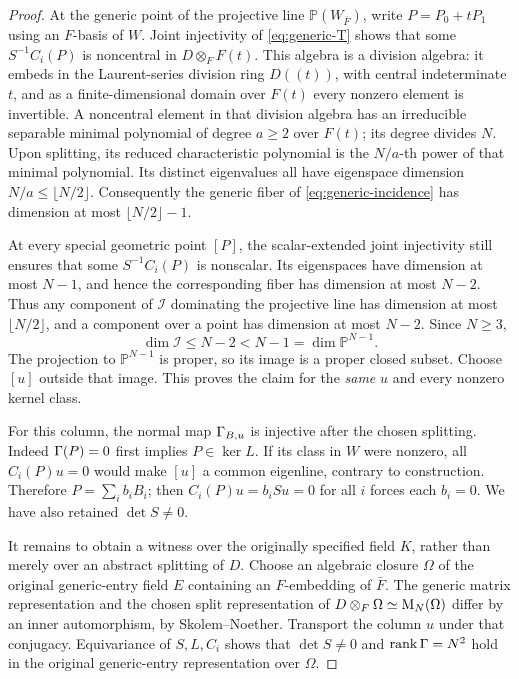 \begin{proof}
At the generic point of the projective line
$\mathbb P(W_{\bar F})$, write $P=P_0+tP_1$ using an
$F$-basis of $W$. Joint injectivity of \eqref{eq:generic-T}
shows that some $S^{-1}C_i(P)$ is noncentral in
$D\otimes_FF(t)$. This algebra is a division algebra:
it embeds in the Laurent-series division ring $D((t))$,
with central indeterminate $t$, and as a finite-dimensional
domain over $F(t)$ every nonzero element is invertible.
A noncentral element in that division algebra has an
irreducible separable minimal polynomial of degree $a\ge2$
over $F(t)$; its degree divides $N$. Upon splitting, its
reduced characteristic polynomial is the $N/a$-th power of
that minimal polynomial. Its distinct eigenvalues all have
eigenspace dimension $N/a\le\lfloor N/2\rfloor$.
Consequently the generic fiber of \eqref{eq:generic-incidence}
has dimension at most $\lfloor N/2\rfloor-1$.

At every special geometric point $[P]$, the scalar-extended
joint injectivity still ensures that some
$S^{-1}C_i(P)$ is nonscalar. Its eigenspaces have dimension
at most $N-1$, and hence the corresponding fiber has
dimension at most $N-2$. Thus any component of
$\mathcal I$ dominating the projective line has dimension
at most $\lfloor N/2\rfloor$, and a component over a
point has dimension at most $N-2$. Since $N\ge3$,
\begin{equation}\label{eq:incidence-bound}
 \dim\mathcal I\le N-2<N-1=\dim\mathbb P^{N-1}.
\end{equation}
The projection to $\mathbb P^{N-1}$ is proper, so its image
is a proper closed subset. Choose $[u]$ outside that image.
This proves the claim for the \emph{same} $u$ and every
nonzero kernel class.

For this column, the normal map $\Gamma_{B,u}$ is injective
after the chosen splitting. Indeed $\Gamma(P)=0$ first implies
$P\in\ker L$. If its class in $W$ were nonzero, all
$C_i(P)u=0$ would make $[u]$ a common eigenline, contrary
to construction. Therefore
$P=\sum_i b_iB_i$; then
$C_i(P)u=b_iSu=0$ for all $i$ forces each $b_i=0$.
We have also retained $\det S\ne0$.

It remains to obtain a witness over the originally specified
field $K$, rather than merely over an abstract splitting of
$D$. Choose an algebraic closure $\Omega$ of the
original generic-entry field $E$ containing an $F$-embedding
of $\bar F$. The generic matrix representation and the
chosen split representation of
$D\otimes_F\Omega\simeq\mathrm{M}_N(\Omega)$ differ by an inner
automorphism, by Skolem--Noether. Transport the column $u$
under that conjugacy. Equivariance of $S,L,C_i$ shows that
$\det S\ne0$ and $\operatorname{rank}\Gamma=N^2$ hold in the original
generic-entry representation over $\Omega$.


\end{proof}
